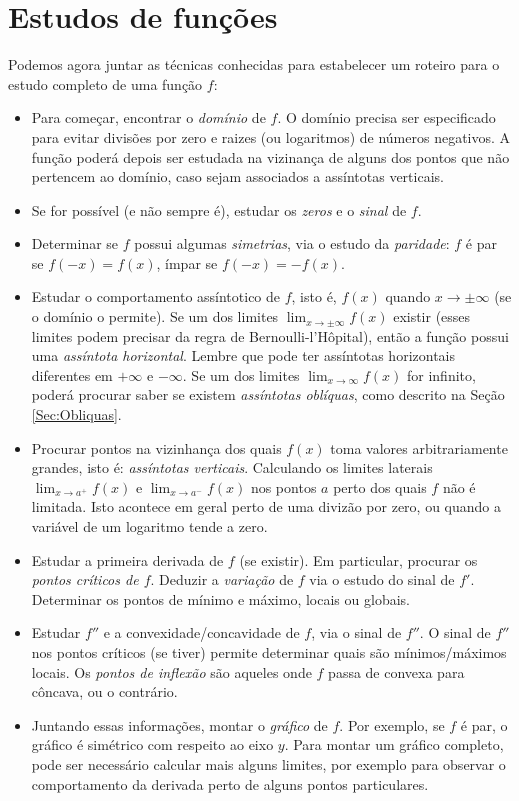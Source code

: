 \section{Estudos de funções}\label{Sec:Estudos}
Podemos agora juntar as técnicas conhecidas para estabelecer um roteiro
para o estudo completo de uma função $f$:
\begin{itemize}
 \item Para começar, encontrar o \emph{domínio} de $f$. O domínio precisa ser
especificado para evitar divisões por zero e raizes (ou logaritmos) de números
negativos. A função poderá depois ser estudada na vizinança de alguns dos
pontos que não pertencem ao domínio, caso
sejam associados a assíntotas verticais.
\item Se for possível (e não sempre é), 
estudar os \emph{zeros} e o \emph{sinal} de $f$.
\item Determinar se $f$ possui algumas \emph{simetrias}, via o estudo da
\emph{paridade}: $f$ é par se $f(-x)=f(x)$, ímpar se $f(-x)=-f(x)$. 
\item Estudar o comportamento assíntotico de $f$, isto é, $f(x)$ quando $x\to
\pm \infty$ (se o domínio
o permite). Se um dos limites $\lim_{x\to \pm\infty}f(x)$ existir (esses limites
podem precisar da regra de Bernoulli-l'Hôpital), então a
função possui uma \emph{assíntota horizontal}. 
Lembre que pode ter assíntotas
horizontais diferentes em $+\infty$ e $-\infty$.
Se um dos limites $\lim_{x\to\infty}f(x)$ for infinito, poderá
procurar saber se existem \emph{assíntotas oblíquas}, como
descrito na Seção \ref{Sec:Obliquas}.
\item Procurar pontos na vizinhança dos quais $f(x)$ toma valores
arbitrariamente grandes, isto é:
\emph{assíntotas verticais}. Calculando os
limites laterais $\lim_{x\to a^+}f(x)$ e $\lim_{x\to a^-}f(x)$ nos pontos $a$
perto dos quais $f$ não é limitada. Isto acontece em geral perto de uma divizão
por zero, ou quando a variável de um logaritmo tende a zero.
\item Estudar a primeira derivada de $f$ (se existir). Em particular,
procurar os \emph{pontos críticos de $f$}. Deduzir a
\emph{variação} de $f$ via o estudo do sinal de $f'$. Determinar os pontos de
mínimo e máximo,  locais ou globais.
\item Estudar $f''$ e a convexidade/concavidade de $f$, via o sinal de $f''$.
O sinal de $f''$ nos pontos críticos (se tiver) permite
determinar quais são mínimos/máximos locais.
Os \emph{pontos de inflexão} são aqueles onde $f$ passa de convexa para
côncava, ou o contrário.
\item Juntando essas informações, montar o \emph{gráfico} de $f$.
Por exemplo, se $f$ é par, o gráfico é simétrico com respeito ao eixo $y$.
Para montar um gráfico completo, 
pode ser necessário calcular mais alguns limites, por exemplo para observar o
comportamento da derivada perto de alguns pontos particulares.
\end{itemize}

